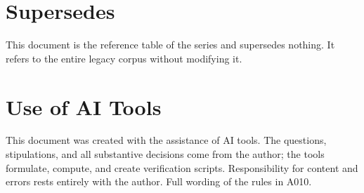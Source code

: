 \section{Supersedes}

This document is the reference table of the series and supersedes nothing. It
refers to the entire legacy corpus without modifying it.

\section{Use of AI Tools}

This document was created with the assistance of AI tools. The questions,
stipulations, and all substantive decisions come from the author; the tools
formulate, compute, and create verification scripts.
Responsibility for content and errors rests entirely with the author.
Full wording of the rules in A010.
